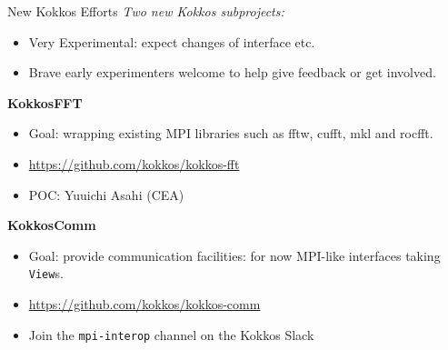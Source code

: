 \begin{frame}[fragile]{New Kokkos Efforts}
\textit{Two new Kokkos subprojects:}

\begin{itemize}
\item Very Experimental: expect changes of interface etc.
\item Brave early experimenters welcome to help give feedback or get involved.
\end{itemize}

\textbf{KokkosFFT}
\begin{itemize}
\item Goal: wrapping existing MPI libraries such as fftw, cufft, mkl and rocfft.
\item \url{https://github.com/kokkos/kokkos-fft}
\item POC: Yuuichi Asahi (CEA)
\end{itemize}

\textbf{KokkosComm}
\begin{itemize}
\item Goal: provide communication facilities: for now MPI-like interfaces taking \texttt{View}s.
\item \url{https://github.com/kokkos/kokkos-comm}
\item Join the \texttt{mpi-interop} channel on the Kokkos Slack
\end{itemize}

\end{frame}
